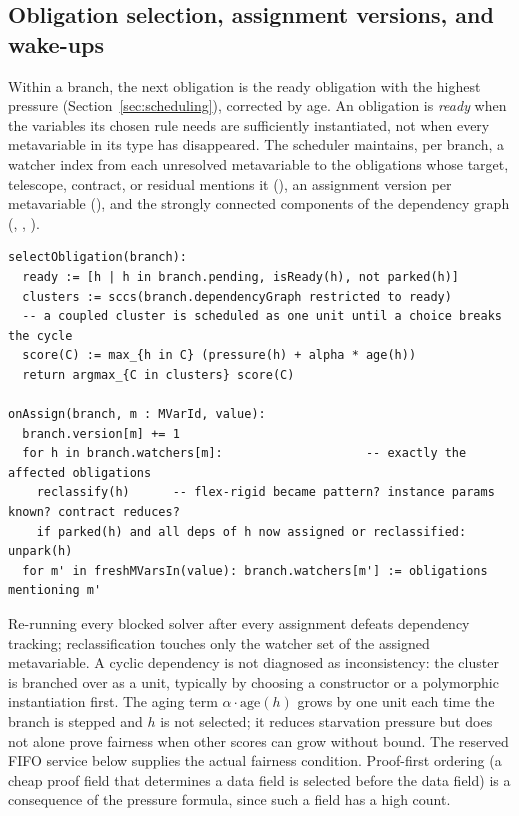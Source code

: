 \subsection{Obligation selection, assignment versions, and wake-ups}\label{alg:wake}

Within a branch, the next obligation is the ready obligation with the highest pressure (Section~\ref{sec:scheduling}), corrected by age. An obligation is \emph{ready} when the variables its chosen rule needs are sufficiently instantiated, not when every metavariable in its type has disappeared. The scheduler maintains, per branch, a watcher index from each unresolved metavariable to the obligations whose target, telescope, contract, or residual mentions it (), an assignment version per metavariable (), and the strongly connected components of the dependency graph (, , ).
\begin{lstlisting}
selectObligation(branch):
  ready := [h | h in branch.pending, isReady(h), not parked(h)]
  clusters := sccs(branch.dependencyGraph restricted to ready)
  -- a coupled cluster is scheduled as one unit until a choice breaks the cycle
  score(C) := max_{h in C} (pressure(h) + alpha * age(h))
  return argmax_{C in clusters} score(C)

onAssign(branch, m : MVarId, value):
  branch.version[m] += 1
  for h in branch.watchers[m]:                    -- exactly the affected obligations
    reclassify(h)      -- flex-rigid became pattern? instance params known? contract reduces?
    if parked(h) and all deps of h now assigned or reclassified: unpark(h)
  for m' in freshMVarsIn(value): branch.watchers[m'] := obligations mentioning m'
\end{lstlisting}
Re-running every blocked solver after every assignment defeats dependency tracking; reclassification touches only the watcher set of the assigned metavariable. A cyclic dependency is not diagnosed as inconsistency: the cluster is branched over as a unit, typically by choosing a constructor or a polymorphic instantiation first. The aging term $\alpha\cdot\mathrm{age}(h)$ grows by one unit each time the branch is stepped and $h$ is not selected; it reduces starvation pressure but does not alone prove fairness when other scores can grow without bound. The reserved FIFO service below supplies the actual fairness condition. Proof-first ordering (a cheap proof field that determines a data field is selected before the data field) is a consequence of the pressure formula, since such a field has a high  count.

